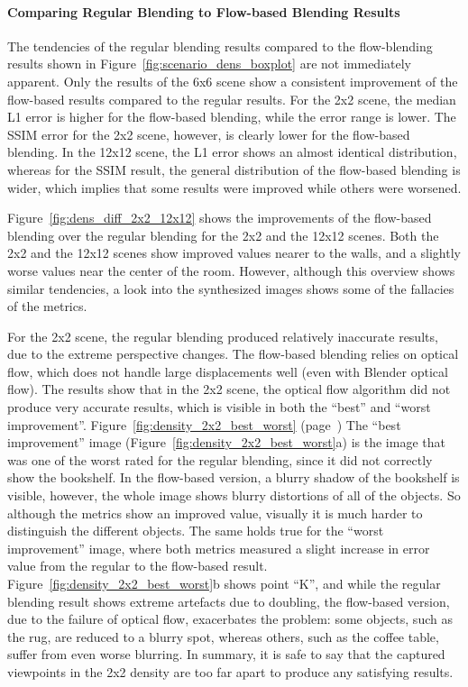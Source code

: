 \paragraph{Comparing Regular Blending to Flow-based Blending Results}
The tendencies of the regular blending results compared to the flow-blending results shown in Figure~\ref{fig:scenario_dens_boxplot} are not immediately apparent. Only the results of the 6x6 scene show a consistent improvement of the flow-based results compared to the regular results. For the 2x2 scene, the median L1 error is higher for the flow-based blending, while the error range is lower. The SSIM error for the 2x2 scene, however, is clearly lower for the flow-based blending. In the 12x12 scene, the L1 error shows an almost identical distribution, whereas for the SSIM result, the general distribution of the flow-based blending is wider, which implies that some results were improved while others were worsened.

Figure~\ref{fig:dens_diff_2x2_12x12} shows the improvements of the flow-based blending over the regular blending for the 2x2 and the 12x12 scenes. Both the 2x2 and the 12x12 scenes show improved values nearer to the walls, and a slightly worse values near the center of the room. However, although this overview shows similar tendencies, a look into the synthesized images shows some of the fallacies of the metrics. 

For the 2x2 scene, the regular blending produced relatively inaccurate results, due to the extreme perspective changes. The flow-based blending relies on optical flow, which does not handle large displacements well (even with Blender optical flow). The results show that in the 2x2 scene, the optical flow algorithm did not produce very accurate results, which is visible in both the ``best'' and ``worst improvement''. Figure~\ref{fig:density_2x2_best_worst} (page~\pageref{fig:density_2x2_best_worst}) The ``best improvement'' image (Figure~\ref{fig:density_2x2_best_worst}a) is the image that was one of the worst rated for the regular blending, since it did not correctly show the bookshelf. In the flow-based version, a blurry shadow of the bookshelf is visible, however, the whole image shows blurry distortions of all of the objects. So although the metrics show an improved value, visually it is much harder to distinguish the different objects. The same holds true for the ``worst improvement'' image, where both metrics measured a slight increase in error value from the regular to the flow-based result. Figure~\ref{fig:density_2x2_best_worst}b shows point ``K'', and while the regular blending result shows extreme artefacts due to doubling, the flow-based version, due to the failure of optical flow, exacerbates the problem: some objects, such as the rug, are reduced to a blurry spot, whereas others, such as the coffee table, suffer from even worse blurring. In summary, it is safe to say that the captured viewpoints in the 2x2 density are too far apart to produce any satisfying results.

